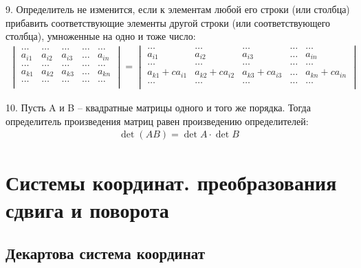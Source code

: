 \documentclass[a4paper,12pt]{extbook}
\theoremstyle{named}
\theoremstyle{named}
\begin{document}
9. Определитель не изменится, если к элементам любой его строки (или столбца) прибавить соответствующие элементы другой строки (или соответствующего столбца), умноженные на одно и тоже число:
\begin{gather*}
    \begin{vmatrix}
        \dots  & \dots  & \dots  & \dots & \dots  \\
        a_{i1} & a_{i2} & a_{i3} & \dots & a_{in} \\
        \dots  & \dots  & \dots  & \dots & \dots  \\
        a_{k1} & a_{k2} & a_{k3} & \dots & a_{kn} \\
        \dots  & \dots  & \dots  & \dots & \dots  \\
    \end{vmatrix}
    =
    \begin{vmatrix}
        \dots            & \dots            & \dots            & \dots & \dots            \\
        a_{i1}           & a_{i2}           & a_{i3}           & \dots & a_{in}           \\
        \dots            & \dots            & \dots            & \dots & \dots            \\
        a_{k1} + ca_{i1} & a_{k2} + ca_{i2} & a_{k3} + ca_{i3} & \dots & a_{kn} + ca_{in} \\
        \dots            & \dots            & \dots            & \dots & \dots            \\
    \end{vmatrix}
\end{gather*}

10. Пусть A и B – квадратные матрицы одного и того же порядка. Тогда определитель произведения матриц равен произведению определителей:
\begin{gather*}
    \det (AB) = \det A \cdot \det B
\end{gather*}



\section{Системы координат. преобразования сдвига и поворота}
\label{sec:coordinate_systems}

\subsection*{Декартова система координат}
\end{document}
